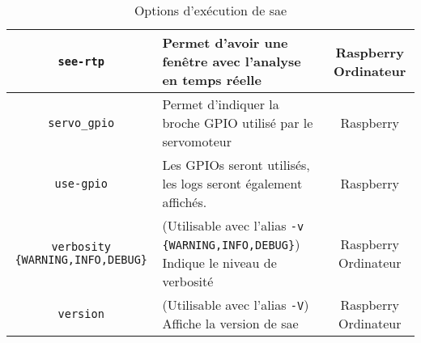 \begin{table}[H]
\begin{tabularx}{\linewidth}{|c|X|c|}
        \verb=see-rtp=                        & Permet d'avoir une fenêtre avec l'analyse en temps réelle                                                                                               & Raspberry Ordinateur \\\hline
        \verb=servo_gpio=                     & Permet d'indiquer la broche GPIO utilisé par le servomoteur                                                                                             & Raspberry            \\\hline
        \verb=use-gpio=                       & Les GPIOs seront utilisés, les logs seront également affichés.                                                                                          & Raspberry            \\\hline
        \verb=verbosity {WARNING,INFO,DEBUG}= & (Utilisable avec l'alias \verb=-v {WARNING,INFO,DEBUG}=) Indique le niveau de verbosité                                                                 & Raspberry Ordinateur \\\hline
        \verb=version=                        & (Utilisable avec l'alias \verb=-V=) Affiche la version de \gls{sae}                                                                                     & Raspberry Ordinateur \\\hline
    \end{tabularx}
    \label{tabOptClearway}
    \caption{Options d'exécution de \gls{sae}}
\end{table}


